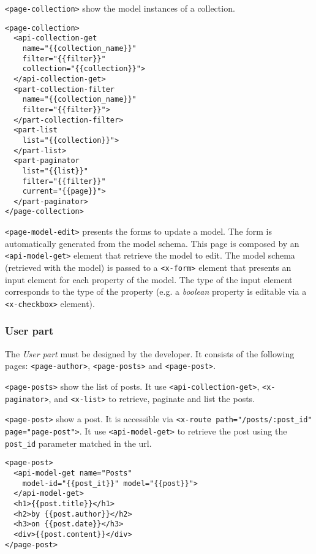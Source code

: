 \vspace{0.2cm}

\texttt{<page-collection>} show the model instances of a collection.

\begin{lstlisting}[language=HTML5]
<page-collection>
  <api-collection-get 
    name="{{collection_name}}" 
    filter="{{filter}}"
    collection="{{collection}}">
  </api-collection-get>
  <part-collection-filter 
    name="{{collection_name}}"  
    filter="{{filter}}">
  </part-collection-filter>
  <part-list 
    list="{{collection}}">
  </part-list>
  <part-paginator 
    list="{{list}}" 
    filter="{{filter}}"
    current="{{page}}">
  </part-paginator>
</page-collection>
\end{lstlisting}

\vspace{0.2cm}

\texttt{<page-model-edit>} presents the forms to update a model.
The form is automatically generated from the model schema.
This page is composed by an \texttt{<api-model-get>} element that retrieve the model to edit. The model schema (retrieved with the model) is passed to a \texttt{<x-form>} element that presents an input element for each property of the model. The type of the input element corresponds to the type of the property (e.g. a \emph{boolean} property is editable via a \texttt{<x-checkbox>} element).

\subsubsection{User part}
The \emph{User part} must be designed by the developer.
It consists of the following pages: \texttt{<page-author>}, \texttt{<page-posts>} and \texttt{<page-post>}. 

\vspace{0.2cm}

\texttt{<page-posts>} show the list of posts. It use \texttt{<api-collection-get>}, \texttt{<x-paginator>}, and \texttt{<x-list>} to retrieve, paginate and list the posts.

\vspace{0.2cm}

\texttt{<page-post>} show a post. It is accessible via 
\texttt{<x-route path="/posts/:post\_id" page="page-post">}. It use \texttt{<api-model-get>} to retrieve the post using the \texttt{post\_id} parameter matched in the url.

\begin{lstlisting}[language=HTML5]
<page-post>
  <api-model-get name="Posts" 
    model-id="{{post_it}}" model="{{post}}">
  </api-model-get>
  <h1>{{post.title}}</h1>
  <h2>by {{post.author}}</h2>
  <h3>on {{post.date}}</h3>
  <div>{{post.content}}</div>
</page-post>
\end{lstlisting}
